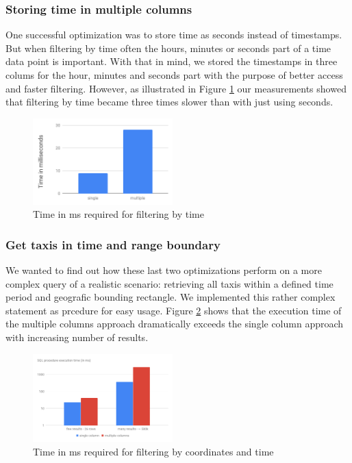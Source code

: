 \documentclass[10pt]{sig-alternate}
\begin{document}
\subsubsection{Storing time in multiple columns}
One successful optimization was to store time as seconds instead of timestamps. But when filtering by time often the hours, minutes or seconds part of a time data point is important. With that in mind, we stored the timestamps in three colums for the hour, minutes and seconds part with the purpose of better access and faster filtering. However, as illustrated in Figure \ref{fig:bench_time_as_multiple_ints} our measurements showed that filtering by time became three times slower than with just using seconds.
\begin{figure}[ht]
  \centering
  \includegraphics[width=0.48\textwidth]{img/bench_time_as_multiple_ints.png}
  \caption{Time in ms required for filtering by time}
  \label{fig:bench_time_as_multiple_ints}
\end{figure}

\subsubsection{Get taxis in time and range boundary}
We wanted to find out how these last two optimizations perform on a more complex query of a realistic scenario: retrieving all taxis within a defined time period and geografic bounding rectangle. We implemented this rather complex statement as prcedure for easy usage. Figure \ref{fig:bench_time_range_boundary} shows that the execution time of the multiple columns approach dramatically exceeds the single column approach with increasing number of results.
\begin{figure}[ht]
  \centering
  \includegraphics[width=0.48\textwidth]{img/bench_time_range_boundary.png}
  \caption{Time in ms required for filtering by coordinates and time}
  \label{fig:bench_time_range_boundary}
\end{figure}
\end{document}
